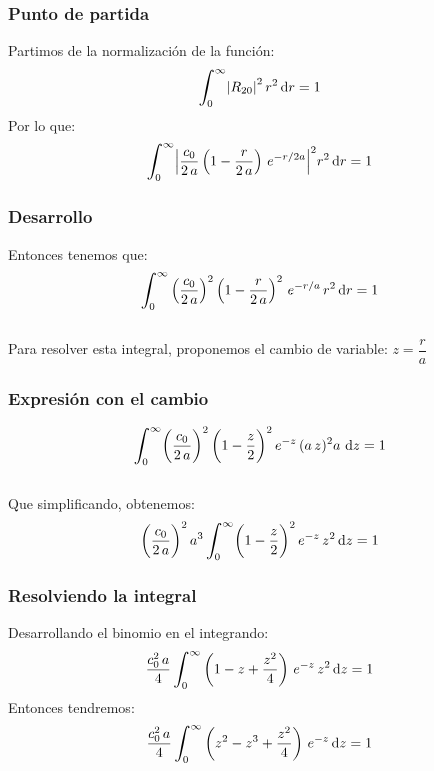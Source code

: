 \documentclass[12pt]{beamer}
\begin{document}
\begin{frame}
\frametitle{Punto de partida}
Partimos de la normalización de la función:
\pause
\begin{align*}
\scaleint{6ex}_{\bs 0}^{\infty} \abs{R_{20}}^{2} \, r^{2} \dd{r} = 1
\end{align*}
\pause
Por lo que:
\pause
\begin{align*}
\scaleint{6ex}_{\bs 0}^{\infty} \abs{ \dfrac{c_{0}}{2 \, a} \left( 1 - \dfrac{r}{2 \, a} \right) \, e^{-r/2a} }^{2} r^{2} \dd{r} = 1
\end{align*}
\end{frame}
\begin{frame}
\frametitle{Desarrollo}
Entonces tenemos que:
\pause
\begin{align*}
\scaleint{6ex}_{\bs 0}^{\infty} \left(\dfrac{c_{0}}{2 \, a}\right)^{2} \left( 1 - \dfrac{r}{2 \, a} \right)^{2} \, e^{-r/a} \, r^{2} \dd{r} = 1
\end{align*}
\\
\bigskip
\pause
Para resolver esta integral, \pause proponemos el cambio de variable: $z = \dfrac{r}{a}$
\end{frame}
\begin{frame}
\frametitle{Expresión con el cambio}
\begin{align*}
\scaleint{6ex}_{\bs 0}^{\infty} \bigg( \dfrac{c_{0}}{2 \, a} \bigg)^{2} \, \bigg( 1 - \dfrac{z}{2} \bigg)^{2} \, e^{-z} \, (a \, z)^{2} a \, \dd{z} = 1
\end{align*}
\\
\bigskip
\pause
Que simplificando, obtenemos:
\pause
\begin{align*}
\bigg( \dfrac{c_{0}}{2 \, a} \bigg)^{2} \, a^{3} \, \scaleint{6ex}_{\bs 0}^{\infty} \bigg( 1 - \dfrac{z}{2} \bigg)^{2} \, e^{-z} \, z^{2} \dd{z} = 1
\end{align*}
\end{frame}
\begin{frame}
\frametitle{Resolviendo la integral}
Desarrollando el binomio en el integrando:
\pause
\begin{align*}
\dfrac{c_{0}^{2} \, a}{4} \, \scaleint{6ex}_{\bs 0}^{\infty} \left( 1 - z + \dfrac{z^{2}}{4} \right) \, e^{-z} \, z^{2} \dd{z} = 1
\end{align*}
\pause
Entonces tendremos:
\pause
\begin{align*}
\dfrac{c_{0}^{2} \, a}{4} \, \scaleint{6ex}_{\bs 0}^{\infty} \left( z^{2} - z^{3} + \dfrac{z^{2}}{4} \right) \, e^{-z} \dd{z} = 1
\end{align*}
\end{frame}
\end{document}

